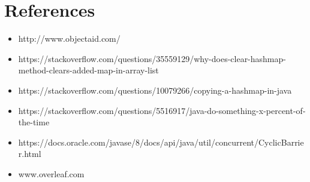 \documentclass[14pt]{article}
\begin{document}
\section*{References}
\vspace{5 mm}
\begin{itemize}
            \item http://www.objectaid.com/
            \item https://stackoverflow.com/questions/35559129/why-does-clear-hashmap-method-clears-added-map-in-array-list
            \item https://stackoverflow.com/questions/10079266/copying-a-hashmap-in-java
            \item https://stackoverflow.com/questions/5516917/java-do-something-x-percent-of-the-time
            \item https://docs.oracle.com/javase/8/docs/api/java/util/concurrent/CyclicBarrier.html
            \item www.overleaf.com
            
\end{itemize}
\end{document}
